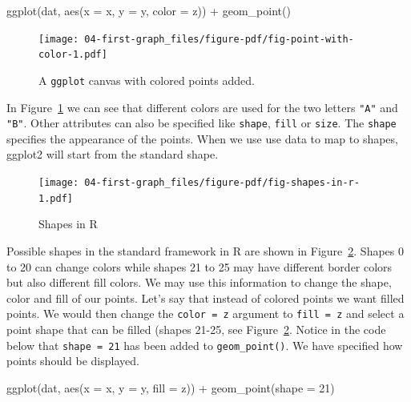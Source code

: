 \documentclass[
  11pt,
  letterpaper,
]{scrbook}
\newenvironment{Shaded}{\begin{snugshade}}{\end{snugshade}}
\newcommand{\AttributeTok}[1]{\textcolor[rgb]{0.40,0.45,0.13}{#1}}
\newcommand{\DecValTok}[1]{\textcolor[rgb]{0.68,0.00,0.00}{#1}}
\newcommand{\FunctionTok}[1]{\textcolor[rgb]{0.28,0.35,0.67}{#1}}
\newcommand{\NormalTok}[1]{\textcolor[rgb]{0.00,0.23,0.31}{#1}}
\newcommand{\SpecialCharTok}[1]{\textcolor[rgb]{0.37,0.37,0.37}{#1}}
\begin{document}
\begin{Shaded}
\begin{Highlighting}[numbers=left,,]
\FunctionTok{ggplot}\NormalTok{(dat, }\FunctionTok{aes}\NormalTok{(}\AttributeTok{x =}\NormalTok{ x, }\AttributeTok{y =}\NormalTok{ y, }\AttributeTok{color =}\NormalTok{ z)) }\SpecialCharTok{+} \FunctionTok{geom\_point}\NormalTok{()}
\end{Highlighting}
\end{Shaded}

\begin{figure}[H]

{\centering \texttt{[image: 04-first-graph\_files/figure-pdf/fig-point-with-color-1.pdf]}

}

\caption{\label{fig-point-with-color}A \texttt{ggplot} canvas with
colored points added.}

\end{figure}

In Figure~\ref{fig-point-with-color} we can see that different colors
are used for the two letters \texttt{"A"} and \texttt{"B"}. Other
attributes can also be specified like \texttt{shape}, \texttt{fill} or
\texttt{size}. The \texttt{shape} specifies the appearance of the
points. When we use use data to map to shapes, ggplot2 will start from
the standard shape.

\begin{figure}

{\centering \texttt{[image: 04-first-graph\_files/figure-pdf/fig-shapes-in-r-1.pdf]}

}

\caption{\label{fig-shapes-in-r}Shapes in R}

\end{figure}

Possible shapes in the standard framework in R are shown in
Figure~\ref{fig-shapes-in-r}. Shapes 0 to 20 can change colors while
shapes 21 to 25 may have different border colors but also different fill
colors. We may use this information to change the shape, color and fill
of our points. Let's say that instead of colored points we want filled
points. We would then change the \texttt{color\ =\ z} argument to
\texttt{fill\ =\ z} and select a point shape that can be filled (shapes
21-25, see Figure~\ref{fig-shapes-in-r}. Notice in the code below that
\texttt{shape\ =\ 21} has been added to \texttt{geom\_point()}. We have
specified how points should be displayed.

\begin{Shaded}
\begin{Highlighting}[numbers=left,,]
\FunctionTok{ggplot}\NormalTok{(dat, }\FunctionTok{aes}\NormalTok{(}\AttributeTok{x =}\NormalTok{ x, }\AttributeTok{y =}\NormalTok{ y, }\AttributeTok{fill =}\NormalTok{ z)) }\SpecialCharTok{+} \FunctionTok{geom\_point}\NormalTok{(}\AttributeTok{shape =} \DecValTok{21}\NormalTok{)}
\end{Highlighting}
\end{Shaded}
\end{document}
